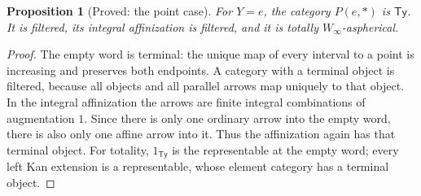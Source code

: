 \documentclass[11pt,a4paper]{article}
\newtheorem{proposition}[theorem]{Proposition}
\theoremstyle{definition}
\theoremstyle{remark}
\begin{document}
\begin{proposition}[Proved: the point case]
\label{E:point}
For $Y=e$, the category $P(e,*)$ is $\mathsf{Ty}$.  It is filtered,
its integral affinization is filtered, and it is totally
$W_\infty$-aspherical.
\end{proposition}
\begin{proof}
The empty word is terminal: the unique map of every interval to a point
is increasing and preserves both endpoints.  A category with a terminal
object is filtered, because all objects and all parallel arrows map
uniquely to that object.  In the integral affinization the arrows are
finite integral combinations of augmentation $1$.  Since there is only
one ordinary arrow into the empty word, there is also only one affine
arrow into it.  Thus the affinization again has that terminal object.
For totality, $1_{\mathsf{Ty}}$ is the representable at the empty word;
every left Kan extension is a representable, whose element category
has a terminal object.
\end{proof}
\end{document}

